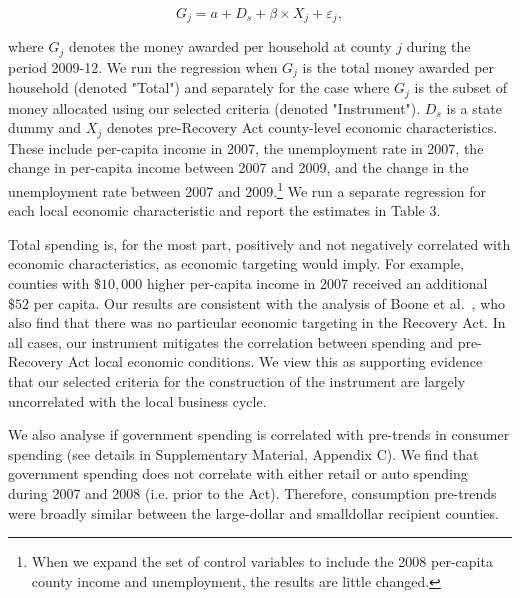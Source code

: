 \documentclass[\latexroot/\projectname]{subfiles}
\begin{document}
\begin{equation*}
G_{j}=a+D_{s}+\beta \times X_{j}+\varepsilon_{j}, \tag{2.1}
\end{equation*}


where $G_{j}$ denotes the money awarded per household at county $j$ during the period 2009-12. We run the regression when $G_{j}$ is the total money awarded per household (denoted "Total") and separately for the case where $G_{j}$ is the subset of money allocated using our selected criteria (denoted "Instrument"). $D_{s}$ is a state dummy and $X_{j}$ denotes pre-Recovery Act county-level economic characteristics. These include per-capita income in 2007, the unemployment rate in 2007, the change in per-capita income between 2007 and 2009, and the change in the unemployment rate between 2007 and 2009.\footnote{When we expand the set of control variables to include the 2008 per-capita county income and unemployment, the results are little changed.} We run a separate regression for each local economic characteristic and report the estimates in Table 3.



Total spending is, for the most part, positively and not negatively correlated with economic characteristics, as economic targeting would imply. For example, counties with $\$ 10,000$ higher per-capita income in 2007 received an additional $\$ 52$ per capita. Our results are consistent with the analysis of Boone et al.~\cite{Boone2014-ix}, who also find that there was no particular economic targeting in the Recovery Act. In all cases, our instrument mitigates the correlation between spending and pre-Recovery Act local economic conditions. We view this as supporting evidence that our selected criteria for the construction of the instrument are largely uncorrelated with the local business cycle.

We also analyse if government spending is correlated with pre-trends in consumer spending (see details in Supplementary Material, Appendix C). We find that government spending does not correlate with either retail or auto spending during 2007 and 2008 (i.e. prior to the Act). Therefore, consumption pre-trends were broadly similar between the large-dollar and smalldollar recipient counties.

\smartbib

\pdfonly{
  \captionsetup[figure]{list=no}
  \captionsetup[table]{list=no}
}
\end{document}
